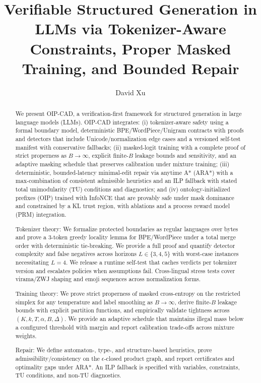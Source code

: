\documentclass{article}
\title{Verifiable Structured Generation in LLMs via Tokenizer-Aware Constraints, Proper Masked Training, and Bounded Repair}
\author[1]{David Xu}
\affil[1]{China Mobile Research Institute}
\date{}
\begin{document}
\maketitle

\begin{abstract}
We present OIP-CAD, a verification-first framework for structured generation in large language models (LLMs). OIP-CAD integrates: (i) tokenizer-aware safety using a formal boundary model, deterministic BPE/WordPiece/Unigram contracts with proofs and detectors that include Unicode/normalization edge cases and a versioned self-test manifest with conservative fallbacks; (ii) masked-logit training with a complete proof of strict properness as $B\to\infty$, explicit finite-$B$ leakage bounds and sensitivity, and an adaptive masking schedule that preserves calibration under mixture training; (iii) deterministic, bounded-latency minimal-edit repair via anytime A* (ARA*) with a max-combination of consistent admissible heuristics and an ILP fallback with stated total unimodularity (TU) conditions and diagnostics; and (iv) ontology-initialized prefixes (OIP) trained with InfoNCE that are provably safe under mask dominance and constrained by a KL trust region, with ablations and a process reward model (PRM) integration.

Tokenizer theory: We formalize protected boundaries as regular languages over bytes and prove a 3-token greedy locality lemma for BPE/WordPiece under a total merge order with deterministic tie-breaking. We provide a full proof and quantify detector complexity and false negatives across horizons $L\in\{3,4,5\}$ with worst-case instances necessitating $L=4$. We release a runtime self-test that caches verdicts per tokenizer version and escalates policies when assumptions fail. Cross-lingual stress tests cover virama/ZWJ shaping and emoji sequences across normalization forms.

Training theory: We prove strict properness of masked cross-entropy on the restricted simplex for any temperature and label smoothing as $B\to\infty$, derive finite-$B$ leakage bounds with explicit partition functions, and empirically validate tightness across $(K,k,T,\alpha,B,\Delta)$. We provide an adaptive schedule that maintains illegal mass below a configured threshold with margin and report calibration trade-offs across mixture weights.

Repair: We define automaton-, type-, and structure-based heuristics, prove admissibility/consistency on the $\epsilon$-closed product graph, and report certificates and optimality gaps under ARA*. An ILP fallback is specified with variables, constraints, TU conditions, and non-TU diagnostics.


\end{abstract}
\end{document}
